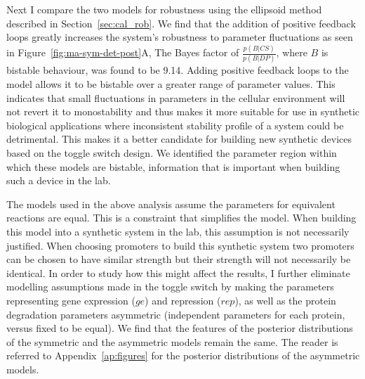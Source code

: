 Next I compare the two models for robustness using the ellipsoid method described in Section~\ref{sec:cal_rob}. We find that the addition of positive feedback loops greatly increases the system's robustness to parameter fluctuations as seen in Figure~\ref{fig:ma-sym-det-post}A, The Bayes factor of $\frac{p(B|CS)}{p(B|DP)}$, where $B$ is bistable behaviour, was found to be 9.14. Adding positive feedback loops to the model allows it to be bistable over a greater range of parameter values. This indicates that small fluctuations in parameters in the cellular environment will not revert it to monostability and thus makes it more suitable for use in synthetic biological applications where inconsistent stability profile of a system could be detrimental. This makes it a better candidate for building new synthetic devices based on the toggle switch design. We identified the parameter region within which these models are bistable, information that is important when building such a device in the lab.

The models used in the above analysis assume the parameters for equivalent reactions are equal. This is a constraint that simplifies the model. When building this model into a synthetic system in the lab, this assumption is not necessarily justified. When choosing promoters to build this synthetic system two promoters can be chosen to have similar strength but their strength will not necessarily be identical.  In order to study how this might affect the results, I further eliminate modelling assumptions made in the toggle switch by making the parameters representing gene expression ($ge$) and repression ($rep$), as well as the protein degradation parameters asymmetric (independent parameters for each protein, versus fixed to be equal). We find that the features of the posterior distributions of the symmetric and the asymmetric models remain the same. The reader is referred to Appendix~\ref{ap:figures} for the posterior distributions of the asymmetric models. 



